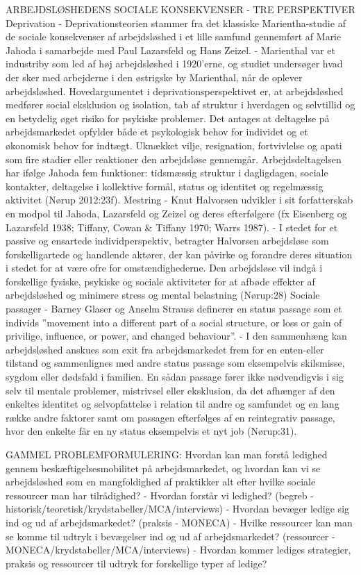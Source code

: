 ARBEJDSLØSHEDENS SOCIALE KONSEKVENSER - TRE PERSPEKTIVER
Deprivation
- Deprivationsteorien stammer fra det klassiske Marientha-studie af de sociale konsekvenser af arbejdsløshed i et lille samfund gennemført af Marie Jahoda i samarbejde med Paul Lazarsfeld og Hans Zeizel. 
- Marienthal var et industriby som led af høj arbejdsløshed i 1920'erne, og studiet undersøger hvad der sker med arbejderne i den østrigske by Marienthal, når de oplever arbejdsløshed. Hovedargumentet i deprivationsperspektivet er, at arbejdsløshed medfører social eksklusion og isolation, tab af struktur i hverdagen og selvtillid og en betydelig øget risiko for psykiske problemer. Det antages at deltagelse på arbejdsmarkedet opfylder både et psykologisk behov for individet og et økonomisk behov for indtægt. Uknækket vilje, resignation, fortvivlelse og apati som fire stadier eller reaktioner den arbejdsløse gennemgår.  Arbejdsdeltagelsen har ifølge Jahoda fem funktioner: tidsmæssig struktur i dagligdagen, sociale kontakter, deltagelse i kollektive formål, status og identitet og regelmæssig aktivitet (Nørup 2012:23f).
Mestring 
- Knut Halvorsen udvikler i sit forfatterskab en modpol til Jahoda, Lazarsfeld og Zeizel og deres efterfølgere (fx Eisenberg og Lazarsfeld 1938; Tiffany, Cowan & Tiffany 1970; Warrs 1987).
- I stedet for et passive og ensartede individperspektiv, betragter Halvorsen arbejdsløse som forskelligartede og handlende aktører, der kan påvirke og forandre deres situation i stedet for at være ofre for omstændighederne. Den arbejdsløse vil indgå i forskellige fysiske, psykiske og sociale aktiviteter for at afbøde effekter af arbejdsløshed og minimere stress og mental belastning (Nørup:28)
Sociale passager
- Barney Glaser og Anselm Strauss definerer en status passage som et individs ”movement into a different part of a social structure, or loss or gain of privilige, influence, or power, and changed behaviour”. 
- I den sammenhæng kan arbejdsløshed anskues som  exit fra arbejdsmarkedet frem for en enten-eller tilstand og sammenlignes med andre status passage som eksempelvis skilsmisse, sygdom eller dødsfald i familien. En sådan passage fører ikke nødvendigvis i sig selv til mentale problemer, mistrivsel eller eksklusion, da det afhænger af den enkeltes identitet og selvopfattelse i relation til andre og samfundet og en lang række andre faktorer samt om passagen efterfølges af en reintegrativ passage, hvor den enkelte får en ny status eksempelvis et nyt job (Nørup:31).




GAMMEL PROBLEMFORMULERING:
Hvordan kan man forstå ledighed gennem beskæftigelsesmobilitet på arbejdsmarkedet,  og hvordan kan vi se arbejdsløshed som en mangfoldighed af praktikker alt efter hvilke sociale ressourcer man har tilrådighed?
- Hvordan forstår vi ledighed? (begreb - historisk/teoretisk/krydstabeller/MCA/interviews)
- Hvordan bevæger ledige sig ind og ud af arbejdsmarkedet? (praksis - MONECA)
- Hvilke ressourcer kan man se komme til udtryk i bevægelser ind og ud af arbejdsmarkedet? (ressourcer - MONECA/krydstabeller/MCA/interviews)
- Hvordan kommer lediges strategier, praksis og ressourcer til udtryk for forskellige typer af ledige? 

